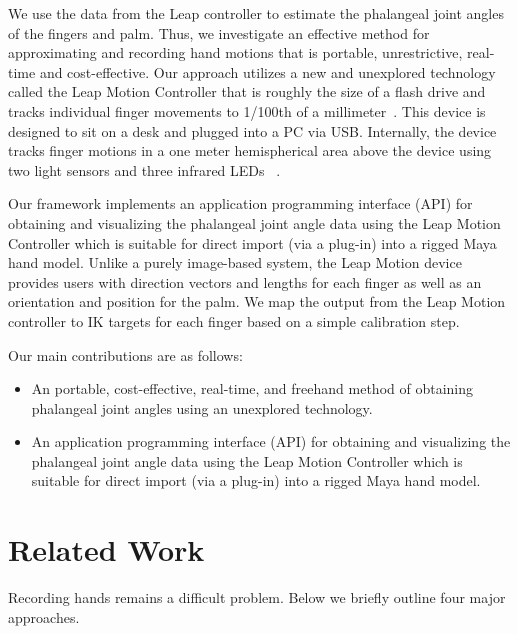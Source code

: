 \documentclass[review]{acmsiggraph}
\begin{document}
We use the data from the Leap controller to estimate the phalangeal 
joint angles of the fingers and palm. 
Thus, we investigate an effective method for approximating and recording 
hand motions that is portable, unrestrictive, real-time 
and cost-effective. Our approach utilizes a new and
unexplored technology called the Leap Motion Controller
that is roughly the size of a flash drive and tracks individual
finger movements to 1/100th of a millimeter~\cite{LEA}. This device is 
designed to sit on a desk and plugged into a PC via USB. Internally, the 
device tracks finger motions in a one meter hemispherical area above the device 
using two light sensors and three infrared LEDs ~\cite{LeapDev}. 

Our framework implements an application programming interface (API)
for obtaining and visualizing the phalangeal joint angle data
using the Leap Motion Controller which is suitable for direct import 
(via a plug-in) into a rigged Maya hand model.  Unlike a purely image-based system, 
the Leap Motion device provides users with direction vectors and lengths for 
each finger as well as an orientation and position for the palm. We map the output 
from the Leap Motion controller to IK targets for each finger based on a simple 
calibration step.

Our main contributions are as follows:
\begin{itemize}
\item An portable, cost-effective, real-time, and freehand
method of obtaining phalangeal joint angles using an
unexplored technology.
\item An application programming interface (API) for 
obtaining and visualizing the phalangeal joint angle data
using the Leap Motion Controller which is suitable for direct import 
(via a plug-in) into a rigged Maya hand model.
\end{itemize}

\section{Related Work}

Recording hands remains a difficult problem. Below we briefly outline four major approaches.

%
\end{document}
